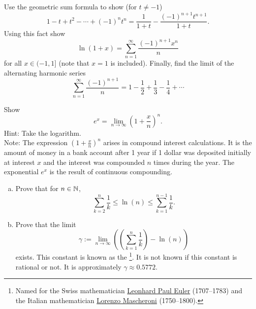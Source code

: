 \begin{exercise}
Use the geometric sum formula to show (for $t\not= -1$)
\begin{equation*}
1-t+t^2-\cdots+{(-1)}^n t^n = \frac{1}{1+t} - \frac{{(-1)}^{n+1}t^{n+1}}{1+t}.
\end{equation*}
Using this fact show
\begin{equation*}
\ln (1+x) = \sum_{n=1}^\infty \frac{{(-1)}^{n+1}x^n}{n} 
\end{equation*}
for all $x \in (-1,1]$ (note that $x=1$ is included).  Finally,
find the limit of the alternating harmonic series
\begin{equation*}
\sum_{n=1}^\infty \frac{{(-1)}^{n+1}}{n} = 1 - \frac{1}{2} +
\frac{1}{3} - \frac{1}{4} + \cdots
\end{equation*}
\end{exercise}

\begin{exercise}
Show 
\begin{equation*}
e^x = \lim_{n\to\infty} {\left( 1 + \frac{x}{n} \right)}^n .
\end{equation*}
Hint: Take the logarithm.\\
Note: The expression 
${\left( 1 + \frac{x}{n} \right)}^n$ arises in compound interest
calculations.  It is the amount of money in a bank account after 1 year
if 1 dollar was deposited initially at interest $x$
and the interest was compounded $n$
times during the year.  The exponential $e^x$ is the result of continuous
compounding.
\end{exercise}

\begin{samepage}
\begin{exercise}
\leavevmode
\begin{enumerate}[a)]
\item
Prove that for $n \in {\mathbb{N}}$,
\begin{equation*}
\sum_{k=2}^{n}
\frac{1}{k}
\leq
\ln (n)
\leq
\sum_{k=1}^{n-1}
\frac{1}{k} .
\end{equation*}
\item
Prove that the limit
\begin{equation*}
\gamma := \lim_{n\to\infty}
\left( \left( \sum_{k=1}^{n} \frac{1}{k} \right) - \ln (n) \right)
\end{equation*}
exists.  This constant is known as the
\emph{}%
\footnote{Named for the Swiss mathematician
\href{https://en.wikipedia.org/wiki/Leonhard_Euler}{Leonhard Paul Euler}
(1707--1783)
and the Italian mathematician
\href{https://en.wikipedia.org/wiki/Lorenzo_Mascheroni}{Lorenzo Mascheroni}
(1750--1800).}.  It is not known if this constant is rational or not.
It is approximately $\gamma \approx 0.5772$.
\end{enumerate}
\end{exercise}
\end{samepage}


